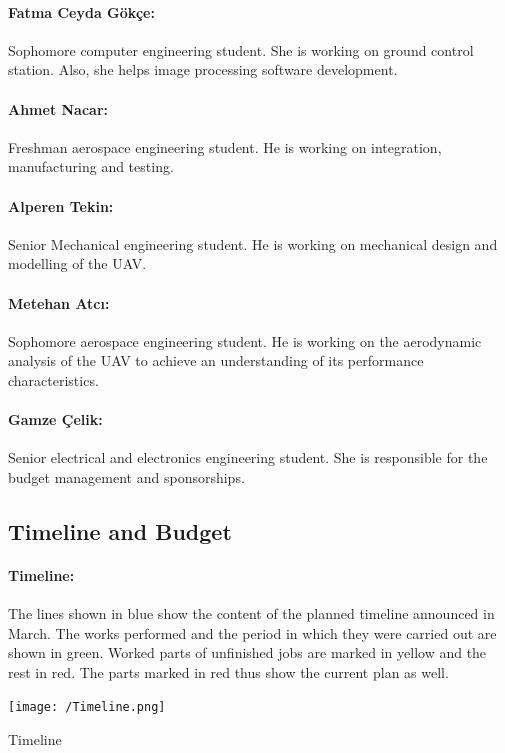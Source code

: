 \documentclass[12pt]{article}
\begin{document}
\paragraph*{Fatma Ceyda Gökçe:} Sophomore computer engineering student. She is working on ground control station. Also, she helps image processing software development.

\paragraph*{Ahmet Nacar:} Freshman aerospace engineering student. He is working on integration, manufacturing and testing. 

\paragraph*{Alperen Tekin:} Senior Mechanical engineering student. He is working on mechanical design and modelling of the UAV.

\paragraph*{Metehan Atcı:} Sophomore aerospace engineering student. He is working on the aerodynamic analysis of the UAV to achieve an understanding of its performance characteristics.

\paragraph*{Gamze Çelik:} Senior electrical and electronics engineering student. She is responsible for the budget management and sponsorships. 

\subsection{Timeline and Budget}
\paragraph*{Timeline:} The lines shown in blue show the content of the planned timeline announced in March. The works performed and the period in which they were carried out are shown in green. Worked parts of unfinished jobs are marked in yellow and the rest in red. The parts marked in red thus show the current plan as well.
\begin{table}[ht]
 	\centering
 	\texttt{[image: /Timeline.png]}
 	\caption{Timeline}
        \label{fig:timeline}
 \end{table}
\FloatBarrier
\clearpage 
\end{document}
